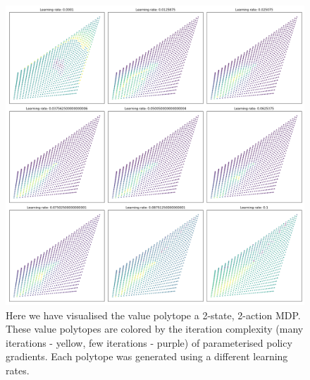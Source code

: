 \begin{figure}[h!]
\centering
\includegraphics[width=1.0\textwidth,height=0.7\textheight]{../../pictures/figures/iteration-lr-0.png}
\caption{Here we have visualised the value polytope a 2-state, 2-action MDP.
These value polytopes are colored by the iteration complexity (many iterations - yellow, few iterations - purple) of parameterised policy gradients.
Each polytope was generated using a different learning rates.}
\label{fig:iteration-complexity}
\end{figure}




%

